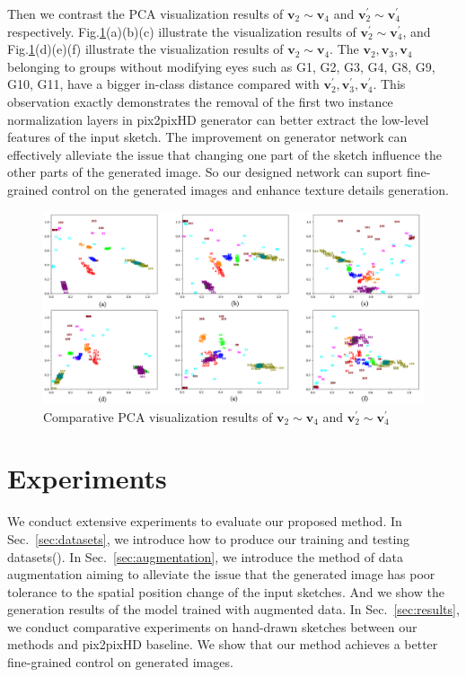 \documentclass[10pt,twocolumn,letterpaper]{article}
\begin{document}
Then we contrast the PCA visualization results of $\boldsymbol{v}_2\sim\boldsymbol{v}_4$ and $\boldsymbol{v}_2^{'}\sim\boldsymbol{v}_4^{'}$ respectively. 
Fig.\ref{fig:pca_4}(a)(b)(c) illustrate the visualization results of $\boldsymbol{v}_2^{'}\sim\boldsymbol{v}_4^{'}$, and Fig.\ref{fig:pca_4}(d)(e)(f) illustrate the visualization results of $\boldsymbol{v}_2\sim\boldsymbol{v}_4$. 
The $\boldsymbol{v}_2, \boldsymbol{v}_3, \boldsymbol{v}_4$ belonging to groups without modifying eyes such as G1, G2, G3, G4, G8, G9, G10, G11, have a bigger in-class distance compared with $\boldsymbol{v}_2^{'}, \boldsymbol{v}_3^{'}, \boldsymbol{v}_4^{'}$. 
This observation exactly demonstrates the removal of the first two instance normalization layers in pix2pixHD generator can better extract the low-level features of the input sketch. 
The improvement on generator network can effectively alleviate the issue that changing one part of the sketch influence the other parts of the generated image. So our designed network can suport fine-grained control on the generated images and enhance texture details generation.
\begin{figure}[htb]
	\centering
	\includegraphics[width=0.8 \textwidth]{pca_4.png}
	\caption{Comparative PCA visualization results of $\boldsymbol{v}_2\sim\boldsymbol{v}_4$ and $\boldsymbol{v}_2^{'}\sim\boldsymbol{v}_4^{'}$}
	\label{fig:pca_4}
\end{figure}


\section{Experiments}
We conduct extensive experiments to evaluate our proposed method.
In Sec.~\ref{sec:datasets}, we introduce how to produce our training and testing datasets(). 
In Sec.~\ref{sec:augmentation}, we introduce the method of data augmentation aiming to alleviate the issue that the generated image has poor tolerance to the spatial position change of the input sketches. And we show the generation results of the model trained with augmented data. 
In Sec.~\ref{sec:results}, we conduct comparative experiments on hand-drawn sketches between our methods and pix2pixHD baseline. We show that our method achieves a better fine-grained control on generated images.
\end{document}
